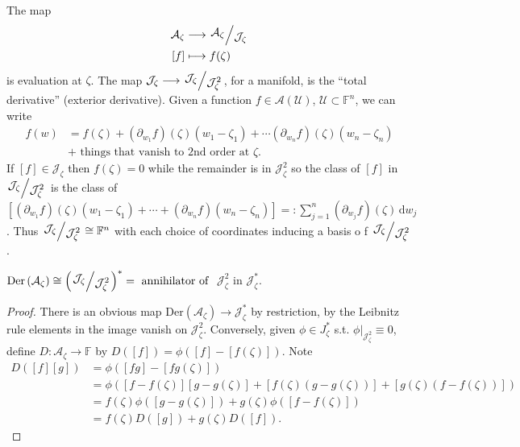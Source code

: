 The map
\begin{align*}
   \mathcal{A}_\zeta  &\longrightarrow \sfrac{\mathcal{A}_{\zeta }}{\mathcal{J}_{\zeta }} \\
   \left[ f \right]  &\longmapsto f(\zeta)
\end{align*}is evaluation at $\zeta$.
The map 
$\mathcal{J}_{\zeta } \longrightarrow  \sfrac{\mathcal{J}_{\zeta }}{\mathcal{J}_{\zeta }^2}$, for a manifold, is the ``total derivative'' (exterior derivative).
Given a function $f\in \mathcal{A}(\mathcal{U})$, $\mathcal{U}\subset \mathbb{F}^{n}$, we can write 
\begin{align*}
  f(w)&=f(\zeta)+\left( \partial_{w_1}f \right) (\zeta)(w_1-\zeta_1)+\cdots \left( \partial_{w_n }f \right) (\zeta)(w_n-\zeta_n)\\
  &+\text{ things that vanish to 2nd order at }\zeta.
\end{align*}
If $\left[ f \right] \in \mathcal{J}_{\zeta }$ then $f(\zeta)=0$ while the remainder is in $\mathcal{J}_\zeta^2$ so the class of $\left[ f \right] $ in $\sfrac{\mathcal{J}_\zeta }{\mathcal{J}_{\zeta }^2}$ is the class of $\left[ \left( \partial_{w_1 }f \right) (\zeta)(w_1-\zeta_1)+\cdots +\left( \partial_{w_n }f \right)\left( w_n-\zeta_n \right)   \right]=: \sum_{j=1}^{n} \left( \partial_{w_j}f \right) (\zeta) \,\mathrm{d} w_j$. Thus $\sfrac{\mathcal{J}_{\zeta }}{\mathcal{J}_{\zeta }^2}\cong \mathbb{F}^{n}$ with each choice of coordinates inducing a basis o f $\sfrac{\mathcal{J}_{\zeta }}{\mathcal{J}_{\zeta }^2}$.

\begin{claim} $\mathrm{Der}\left( \mathcal{A}_\zeta  \right) \cong \left( \sfrac{\mathcal{J}_{\zeta }}{\mathcal{J}^2_{\zeta }} \right) ^{*}= \text{ annihilator of }$ $\mathcal{J}_{\zeta }^2$ in $\mathcal{J}_\zeta ^{*}$.
\end{claim}
\begin{proof}
  There is an obvious map $\mathrm{Der}\left( \mathcal{A}_\zeta  \right) \to \mathcal{J}^{*}_{\zeta }$ by restriction, by the Leibnitz rule elements in the image vanish on $\mathcal{J}^2_{\zeta }$. Conversely, given $\phi \in J_{\zeta }^{*}$ s.t. $\phi|_{\mathcal{J}^2_{\zeta }}\equiv 0$, define $D:\mathcal{A}_{\zeta }\to \mathbb{F}$ by $D\left( \left[ f \right]  \right) =\phi \left( \left[ f \right] -\left[ f(\zeta) \right]  \right) $. Note 
  \begin{align*}
    D\left( \left[ f \right] \left[ g \right]  \right) &=\phi\left( \left[ fg \right] -\left[ fg(\zeta) \right]  \right) \\
						       &= \phi \left( \left[ f-f(\zeta) \right] \left[ g-g(\zeta) \right] +\left[ f(\zeta)(g-g(\zeta)) \right] +\left[ g(\zeta)\left( f-f(\zeta) \right)  \right]  \right) \\
						       &= f(\zeta) \phi\left( \left[ g-g(\zeta) \right]  \right) +g(\zeta)\phi\left( \left[ f-f(\zeta) \right]  \right)\\
						       &= f(\zeta)D\left( \left[ g \right]  \right) +g(\zeta) D\left( \left[ f \right]  \right)
  .\end{align*}
\end{proof}

